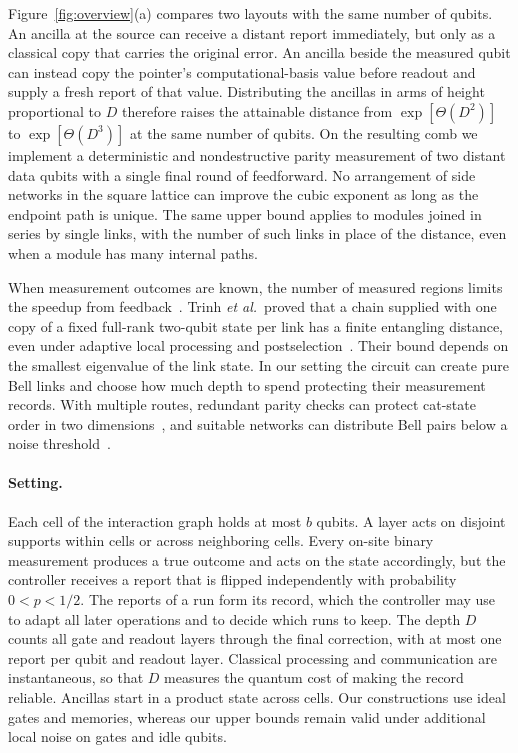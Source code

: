 \documentclass[aps,prl,twocolumn,superscriptaddress,longbibliography,reprint,floatfix]{revtex4-2}
\begin{document}
Figure~\ref{fig:overview}(a) compares two layouts with the same number of qubits. An ancilla at the source can receive a distant report immediately, but only as a classical copy that carries the original error. An ancilla beside the measured qubit can instead copy the pointer's computational-basis value before readout and supply a fresh report of that value. Distributing the ancillas in arms of height proportional to $D$ therefore raises the attainable distance from $\exp[\Theta(D^2)]$ to $\exp[\Theta(D^3)]$ at the same number of qubits. On the resulting comb we implement a deterministic and nondestructive parity measurement of two distant data qubits with a single final round of feedforward. No arrangement of side networks in the square lattice can improve the cubic exponent as long as the endpoint path is unique. The same upper bound applies to modules joined in series by single links, with the number of such links in place of the distance, even when a module has many internal paths.

When measurement outcomes are known, the number of measured regions limits the speedup from feedback~\cite{Friedman2023}. Trinh \emph{et al.}\ proved that a chain supplied with one copy of a fixed full-rank two-qubit state per link has a finite entangling distance, even under adaptive local processing and postselection~\cite{Trinh2026}. Their bound depends on the smallest eigenvalue of the link state. In our setting the circuit can create pure Bell links and choose how much depth to spend protecting their measurement records. With multiple routes, redundant parity checks can protect cat-state order in two dimensions~\cite{Zhu2023,Chen2025}, and suitable networks can distribute Bell pairs below a noise threshold~\cite{Raussendorf2005,Choe2024,Harley2026}.

\smallskip
\paragraph*{Setting.}
Each cell of the interaction graph holds at most $b$ qubits. A layer acts on disjoint supports within cells or across neighboring cells. Every on-site binary measurement produces a true outcome and acts on the state accordingly, but the controller receives a report that is flipped independently with probability $0<p<1/2$. The reports of a run form its record, which the controller may use to adapt all later operations and to decide which runs to keep. The depth $D$ counts all gate and readout layers through the final correction, with at most one report per qubit and readout layer. Classical processing and communication are instantaneous, so that $D$ measures the quantum cost of making the record reliable. Ancillas start in a product state across cells. Our constructions use ideal gates and memories, whereas our upper bounds remain valid under additional local noise on gates and idle qubits.
\end{document}
